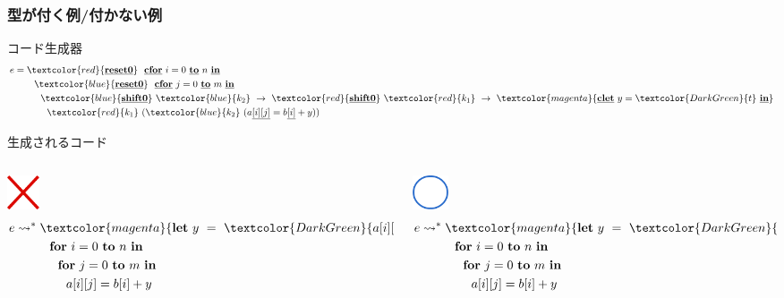 \documentclass[dvipdfmx,cjk,xcolor=dvipsnames,envcountsect,notheorems,12pt]{beamer}
\newcommand\cResetz{\underline{\textbf{reset0}}}
\newcommand\cShiftz{\underline{\textbf{shift0}}}
\newcommand\cLet{\underline{\textbf{clet}}}
\newcommand\cIn{\underline{\textbf{in}}}
\newcommand\too{\leadsto^*}
\newcommand\red[1]{\textcolor{red}{#1}}
\newcommand\green[1]{\textcolor{DarkGreen}{#1}}
\newcommand\magenta[1]{\textcolor{magenta}{#1}}
\newcommand\blue[1]{\textcolor{blue}{#1}}
\newcommand\forin[2]{\textbf{for}~{#1}~\textbf{to}~{#2}~\textbf{in}}
\newcommand\cforin[2]{\underline{\textbf{cfor}}~{#1}~\underline{\textbf{to}}~{#2}~\underline{\textbf{in}}}
\newcommand\Let{\textbf{let}}
\newcommand\In{\textbf{in}}
\newcommand\cArray[1]{\underline{[{#1}]}}
\newcommand\cArrays[2]{\underline{[{#1}][{#2}]}}
\theoremstyle{definition}
\begin{document}
\begin{frame}
  \frametitle{型が付く例/付かない例}
  コード生成器
  \begin{align*}
    e & = \red{\cResetz} ~~\cforin{i = 0}{n} \\
      & \phantom{=}~~~~\blue{\cResetz} ~~\cforin{j = 0}{m} \\
      & \phantom{=}~~~~~~ \blue{\cShiftz}~\blue{k_2}~\to~ \red{\cShiftz}~\red{k_1}~\to~ \magenta{\cLet~y=\green{t}~\cIn} \\
      & \phantom{=}~~~~~~~~ \red{k_1}~(\blue{k_2}~(a\cArrays{i}{j} = b\cArray{i} + y))
  \end{align*}

  \pause
  生成されるコード
  \begin{columns}
    \begin{column}{0.5\textwidth}%
      \center
      \includegraphics[clip,height=1cm]{../img/batsu.png}
      \begin{align*}
        e & \too \magenta{\Let ~y ~= ~\green{a[i][j]} ~\In} \\
          & \phantom{\too}~~~~ \forin{i = 0}{n} \\
          & \phantom{\too}~~~~~~\forin{j = 0}{m} \\
          & \phantom{\too}~~~~~~~~a[i][j] = b[i] + y \\
      \end{align*}
    \end{column}

    \begin{column}{0.5\textwidth}%
      \center
      \includegraphics[height=1cm]{../img/maru.png}
      \begin{align*}
        e & \too \magenta{\Let ~y ~= ~\green{7} ~\In} \\
          & \phantom{\too}~~~~ \forin{i = 0}{n} \\
          & \phantom{\too}~~~~~~\forin{j = 0}{m} \\
          & \phantom{\too}~~~~~~~~a[i][j] = b[i] + y \\
      \end{align*}
    \end{column}
  \end{columns}
\end{frame}
\end{document}
